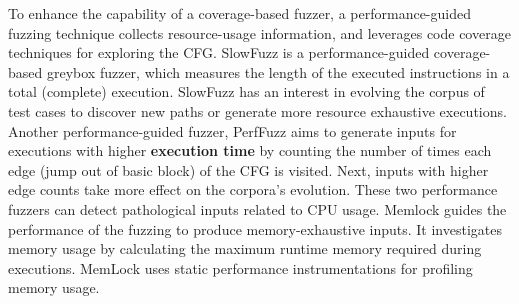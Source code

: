 To enhance the capability of a coverage-based fuzzer, a performance-guided fuzzing technique collects resource-usage information, and leverages code coverage techniques for exploring the CFG. SlowFuzz \cite{petsios2017slowfuzz} is a performance-guided coverage-based greybox fuzzer, which measures the length of the executed instructions in a total (complete) execution. SlowFuzz has an interest in evolving the corpus of test cases to discover new paths or generate more resource exhaustive executions. Another performance-guided fuzzer, PerfFuzz \cite{lemieux2018perffuzz} aims to generate inputs for executions with higher \textbf{execution time} by counting the number of times each edge (jump out of basic block) of the CFG is visited. Next, inputs with higher edge counts take more effect on the corpora's evolution. These two performance fuzzers can detect pathological inputs related to CPU usage. Memlock \cite{wen2020memlock} guides the performance of the fuzzing to produce memory-exhaustive inputs. It investigates memory usage by calculating the maximum runtime memory required during executions. MemLock uses static performance instrumentations for profiling memory usage.

